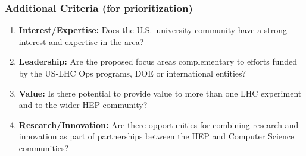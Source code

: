\begin{frame}
\frametitle{Additional Criteria (for prioritization)}

\begin{enumerate}
\item {\bf Interest/Expertise:} Does the U.S.\ university community have a strong interest and expertise in the area?
\item {\bf Leadership:} Are the proposed focus areas complementary to efforts funded by the US-LHC Ops programs, DOE or international entities?
\item {\bf Value:} Is there potential to provide value to more than one LHC experiment and to the wider HEP community?
\item {\bf Research/Innovation:} Are there opportunities for combining research and innovation as part of partnerships between the HEP and Computer Science communities?
\end{enumerate}

\end{frame}


